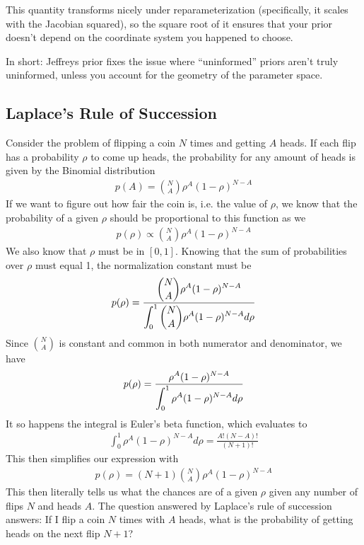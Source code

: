 This quantity transforms nicely under reparameterization (specifically, it scales with the Jacobian squared), so the square root of it ensures that your prior doesn’t depend on the coordinate system you happened to choose.

In short: Jeffreys prior fixes the issue where “uninformed” priors aren’t truly uninformed, unless you account for the geometry of the parameter space.

\subsection{Laplace's Rule of Succession}
Consider the problem of flipping a coin $N$ times and getting $A$ heads. If each flip has a probability $\rho$ to come up heads, the probability for any amount of heads is given by the Binomial distribution
\begin{align}
p(A) = {N\choose A}\rho^A(1-\rho)^{N-A}
\end{align}
If we want to figure out how fair the coin is, i.e. the value of $\rho$, we know that the probability of a given $\rho$ should be proportional to this function as we
\begin{align}
	p(\rho) \propto {N\choose A}\rho^A(1-\rho)^{N-A}
\end{align}
We also know that $\rho$ must be in $[0,1]$. Knowing that the sum of probabilities over $\rho$ must equal 1, the normalization constant must be
\begin{align}
	p(\rho) =\frac{\displaystyle  {N\choose A}\rho^A(1-\rho)^{N-A}}{\displaystyle \int_0^1{N\choose A}\rho^A(1-\rho)^{N-A} d\rho}
\end{align}
Since ${N\choose A}$ is constant and common in both numerator and denominator, we have
\begin{align}
	p(\rho) =\frac{\displaystyle  \rho^A(1-\rho)^{N-A}}{\displaystyle \int_0^1\rho^A(1-\rho)^{N-A} d\rho}
\end{align}
It so happens the integral is Euler's beta function, which evaluates to 
\begin{align}
	\int_0^1\rho^A(1-\rho)^{N-A} d\rho = \frac{A!(N-A)!}{(N+1)!}
\end{align}
This then simplifies our expression with
\begin{align}
	p(\rho) =(N+1){N\choose A}\rho^A(1-\rho)^{N-A}
\end{align}
This then literally tells us what the chances are of a given $\rho$ given any number of flips $N$ and heads $A$. The question answered by Laplace's rule of succession answers: If I flip a coin $N$ times with $A$ heads, what is the probability of getting heads on the next flip $N+1$?

